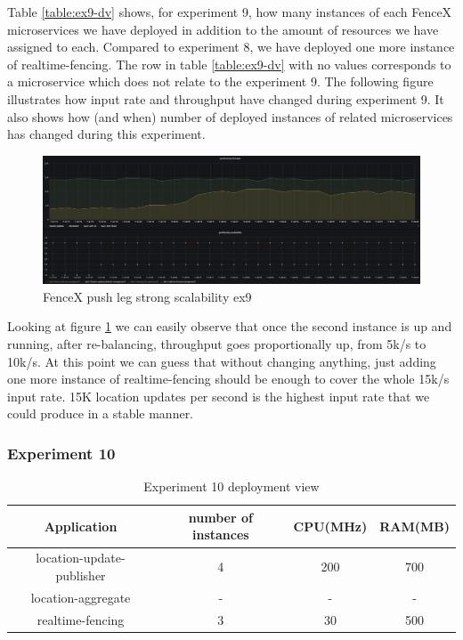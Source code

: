\documentclass[a4]{report}
\begin{document}
    Table \ref{table:ex9-dv} shows, for experiment 9, how many instances of each FenceX microservices we have
    deployed in addition to the amount of resources we have assigned to each.
    Compared to experiment 8, we have deployed one more instance of realtime-fencing.
    The row in table \ref{table:ex9-dv} with no values corresponds to a microservice which does not relate to the
    experiment 9.
    The following figure illustrates how input rate and throughput have changed during experiment 9.
    It also shows how (and when) number of deployed instances of related microservices has changed during this
    experiment.

    \begin{figure}[h!]
        \centering
        \caption{FenceX push leg strong scalability ex9}
        \label{fig:ex9}
        \includegraphics[width=\linewidth, scale=2]{images/evaluation/ex9-benchmarking-ongoing-2per4sec.png}
    \end{figure}

    Looking at figure \ref{fig:ex9} we can easily observe that once the second instance is up and running, after
    re-balancing, throughput goes proportionally up, from 5k/s to 10k/s.
    At this point we can guess that without changing anything, just adding one more instance of realtime-fencing
    should be enough to cover the whole 15k/s input rate.
    15K location updates per second is the highest input rate that we could produce in a stable manner.

    \clearpage

    \subsubsection{Experiment 10}
    \begin{table}[h!]
        \centering
        \begin{tabular}{|c|c|c|c|}
            \hline
            Application               & number of instances & CPU(MHz) & RAM(MB) \\
            \hline
            location-update-publisher & 4                   & 200      & 700     \\
            location-aggregate        & -                   & -        & -       \\
            realtime-fencing          & 3                   & 30       & 500     \\
            \hline
        \end{tabular}
        \caption{Experiment 10 deployment view}
        \label{table:ex10-dv}
    \end{table}
\end{document}
